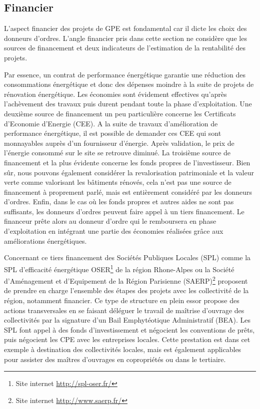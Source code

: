\subsection{Financier}

L'aspect financier des projets de GPE est fondamental car il dicte les choix des donneurs d'ordres. L'angle financier pris dans cette section ne considère que les sources de financement et deux indicateurs de l'estimation de la rentabilité des projets.

Par essence, un contrat de performance énergétique garantie une réduction des consommations énergétique et donc des dépenses moindre à la suite de projets de rénovation énergétique. Les économies sont évidement effectives qu'après l'achèvement des travaux puis durent pendant toute la phase d'exploitation. Une deuxième source de financement un peu particulière concerne les Certificats d'Economie d'Energie (CEE). A la suite de travaux d'amélioration de performance énergétique, il est possible de demander ces CEE qui sont monnayables auprès d'un fournisseur d'énergie. Après validation, le prix de l'énergie consommé sur le site se retrouve diminué. La troisième source de financement et la plus évidente concerne les fonds propres de l'investisseur. Bien sûr, nous pouvons également considérer la revalorisation patrimoniale et la valeur verte comme valorisant les bâtiments rénovés, cela n'est pas une source de financement à proprement parlé, mais est entièrement considéré par les donneurs d'ordres. Enfin, dans le cas où les fonds propres et autres aides ne sont pas suffisants, les donneurs d'ordres peuvent faire appel à un tiers financement. Le financeur prête alors au donneur d'ordre qui le remboursera en phase d'exploitation en intégrant une partie des économies réalisées grâce aux améliorations énergétiques.

Concernant ce tiers financement des Sociétés Publiques Locales (SPL) comme la SPL d'efficacité énergétique OSER\footnote{Site internet \url{http://spl-oser.fr/}} de la région Rhone-Alpes ou la Société d'Aménagement et d'Equipement de la Région Parisienne (SAERP)\footnote{Site internet \url{http://www.saerp.fr/}} proposent de prendre en charge l'ensemble des étapes des projets avec les collectivité de la région, notamment financier. Ce type de structure en plein essor propose des actions transversales en se faisant déléguer le travail de maîtrise d'ouvrage des collectivités par la signature d'un Bail Emphytéotique Administratif (BEA). Les SPL font appel à des fonds d'investissement et négocient les conventions de prêts, puis négocient les CPE avec les entreprises locales. Cette prestation est dans cet exemple à destination des collectivités locales, mais est également applicables pour assister des maîtres d'ouvrages en copropriétés ou dans le tertiaire.

